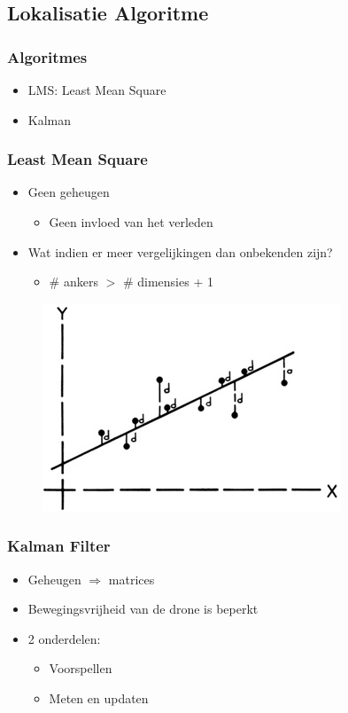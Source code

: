 \documentclass{beamer}
\begin{document}
\subsection{Lokalisatie Algoritme}
  \begin{frame}
    \frametitle{Algoritmes}
    \begin{itemize}
      \item LMS: Least Mean Square
      \item Kalman 
    \end{itemize}
  \end{frame}
  \begin{frame}
    \frametitle{Least Mean Square}
    \begin{itemize}
      \item Geen geheugen
        \begin{itemize}
          \item Geen invloed van het verleden
        \end{itemize}
      \item Wat indien er meer vergelijkingen dan onbekenden zijn?
        \begin{itemize}
          \item \# ankers $>$ \# dimensies + 1
        \end{itemize}
    \end{itemize}
    \begin{figure}
      \centering
        \includegraphics[width=.5\textwidth]{images/LMS.jpg}
    \end{figure}
  \end{frame}
  \begin{frame}
    \frametitle{Kalman Filter}
    \begin{itemize}
      \item Geheugen $\Rightarrow$ matrices
      \item Bewegingsvrijheid van de drone is beperkt
      \item 2 onderdelen:
        \begin{itemize}
          \item Voorspellen
          \item Meten en updaten
        \end{itemize}
    \end{itemize}
  \end{frame}
\end{document}
